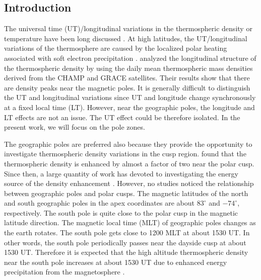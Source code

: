 \documentclass[draft, grl]{/home/guod/Documents/template/agu_template/AGUTeX}
\begin{document}
\begin{article}

\section{Introduction}
    The universal time (UT)/longitudinal variations in the thermospheric density
    or temperature have been long discussed \citep[e.g.,][]{Hedin1972, 
    Hedin1979, Hedin1985, Xu2013a, Xu2013}. 
    At high latitudes, the UT/longitudinal variations of the thermosphere are 
    caused by the localized polar heating associated with soft electron 
    precipitation \citep{Hedin1972}. 
    \citet{Xu2013} analyzed the longitudinal structure of the thermospheric
    density by using the daily mean thermospheric mass densities derived from 
    the CHAMP and GRACE satellites. 
    Their results show that there are density peaks near the magnetic poles. 
    It is generally difficult to distinguish the UT and longitudinal variations 
    since UT and longitude change synchronously at a fixed local time (LT). 
    However, near the geographic poles, the longitude and LT effects are not an
    issue. 
    The UT effect could be therefore isolated. 
    In the present work, we will focus on the pole zones.

    The geographic poles are preferred also because they provide the opportunity
    to investigate thermospheric density variations in the cusp region. 
    \citet{Luhr2004} found that the thermospheric density is enhanced by almost 
    a factor of two near the polar cusp.  
    Since then, a large quantity of work has devoted to investigating the energy
    source of the density enhancement \citep[e.g.,][]{Deng2011, Knipp2011, 
    Zhang2012, Deng2013, Zhang2015}.  
    However, no studies noticed the relationship between geographic poles and 
    polar cusps. 
    The magnetic latitudes of the north and south geographic poles in the
    apex coordinates are about $83^{\circ}$ and $-74^{\circ}$, respectively. 
    The south pole is quite close to the polar cusp in the magnetic latitude 
    direction. 
    The magnetic local time (MLT) of geographic poles changes as the earth 
    rotates. 
    The south pole gets close to 1200 MLT at about 1530 UT. In other words, the 
    south pole periodically passes near the dayside cusp at about 1530 UT. 
    Therefore it is expected that the high altitude thermospheric density near 
    the south pole increases at about 1530 UT due to enhanced energy 
    precipitation from the magnetosphere \citep{Luhr2004}.


\end{article}
\end{document}
